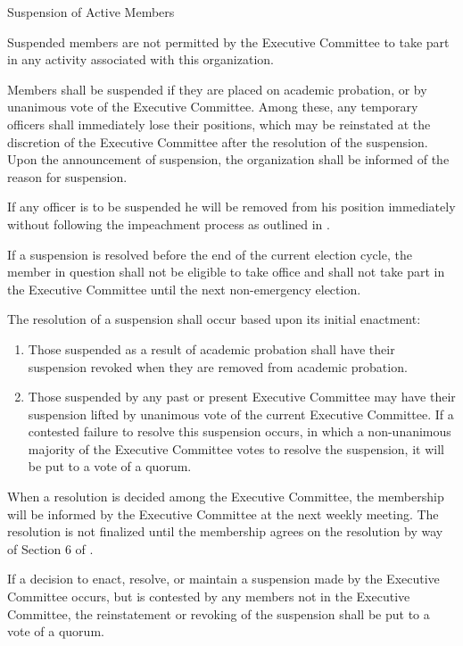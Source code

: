 {
\begin{article}{Suspension of Active Members}
	\item Suspended members are not permitted by the Executive Committee to take part in any activity associated with this organization.
	\item Members shall be suspended if they are placed on academic probation, or by unanimous vote of the Executive Committee.  Among these, any temporary officers shall immediately lose their positions, which may be reinstated at the discretion of the Executive Committee after the resolution of the suspension.  Upon the announcement of suspension, the organization shall be informed of the reason for suspension.
	\item If any officer is to be suspended he will be removed from his position immediately without following the impeachment process as outlined in .
	\item If a suspension is resolved before the end of the current election cycle, the member in question shall not be eligible to take office and shall not take part in the Executive Committee until the next non-emergency election.
	\item The resolution of a suspension shall occur based upon its initial enactment:
	\begin{enumerate}
		\item Those suspended as a result of academic probation shall have their suspension revoked when they are removed from academic probation.
		\item Those suspended by any past or present Executive Committee may have their suspension lifted by unanimous vote of the current Executive Committee.  If a contested failure to resolve this suspension occurs, in which a non-unanimous majority of the Executive Committee votes to resolve the suspension, it will be put to a vote of a quorum.
	\end{enumerate}
	When a resolution is decided among the Executive Committee, the membership will be informed by the Executive Committee at the next weekly meeting.  The resolution is not finalized until the membership agrees on the resolution by way of Section 6 of .
	\item If a decision to enact, resolve, or maintain a suspension made by the Executive Committee occurs, but is contested by any members not in the Executive Committee, the reinstatement or revoking of the suspension shall be put to a vote of a quorum.
\end{article}
}